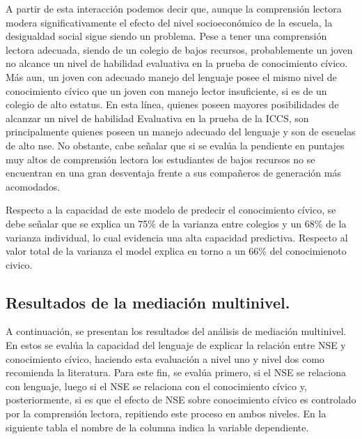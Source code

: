 \documentclass[12pt,twoside]{templates/facsothesis}
\begin{document}
A partir de esta interacción podemos decir que, aunque la comprensión lectora modera significativamente el efecto del nivel socioeconómico de la escuela, la desigualdad social sigue siendo un problema. Pese a tener una comprensión lectora adecuada, siendo de un colegio de bajos recursos, probablemente un joven no alcance un nivel de habilidad evaluativa en la prueba de conocimiento cívico. Más aun, un joven con adecuado manejo del lenguaje posee el mismo nivel de conocimiento cívico que un joven con manejo lector insuficiente, si es de un colegio de alto estatus. En esta línea, quienes poseen mayores posibilidades de alcanzar un nivel de habilidad Evaluativa en la prueba de la ICCS, son principalmente quienes poseen un manejo adecuado del lenguaje y son de escuelas de alto nse. No obstante, cabe señalar que si se evalúa la pendiente en puntajes muy altos de comprensión lectora los estudiantes de bajos recursos no se encuentran en una gran desventaja frente a sus compañeros de generación más acomodados.

Respecto a la capacidad de este modelo de predecir el conocimiento cívico, se debe señalar que se explica un 75\% de la varianza entre colegios y un 68\% de la varianza individual, lo cual evidencia una alta capacidad predictiva. Respecto al valor total de la varianza el model explica en torno a un 66\% del conocimienoto civico.

\hypertarget{resultados-de-la-mediaciuxf3n-multinivel.}{%
\subsection{Resultados de la mediación multinivel.}\label{resultados-de-la-mediaciuxf3n-multinivel.}}

A continuación, se presentan los resultados del análisis de mediación multinivel. En estos se evalúa la capacidad del lenguaje de explicar la relación entre NSE y conocimiento cívico, haciendo esta evaluación a nivel uno y nivel dos como recomienda la literatura. Para este fin, se evalúa primero, si el NSE se relaciona con lenguaje, luego si el NSE se relaciona con el conocimiento cívico y, posteriormente, si es que el efecto de NSE sobre conocimiento cívico es controlado por la comprensión lectora, repitiendo este proceso en ambos niveles. En la siguiente tabla el nombre de la columna indica la variable dependiente.
\end{document}
